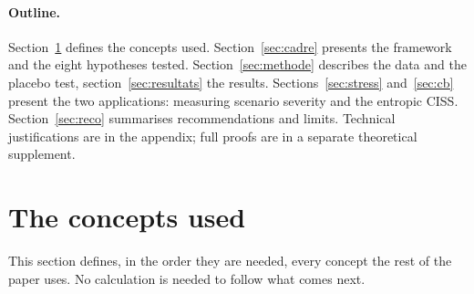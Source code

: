 \documentclass[11pt]{article}
\theoremstyle{definition}
\begin{document}
\paragraph{Outline.} Section~\ref{sec:concepts} defines the concepts used.
Section~\ref{sec:cadre} presents the framework and the eight hypotheses tested.
Section~\ref{sec:methode} describes the data and the placebo test,
section~\ref{sec:resultats} the results. Sections~\ref{sec:stress}
and~\ref{sec:cb} present the two applications: measuring scenario severity and
the entropic CISS. Section~\ref{sec:reco} summarises recommendations and
limits. Technical justifications are in the appendix; full proofs are in a
separate theoretical supplement.

\section{The concepts used}
\label{sec:concepts}

This section defines, in the order they are needed, every concept the rest of
the paper uses. No calculation is needed to follow what comes next.
\end{document}
